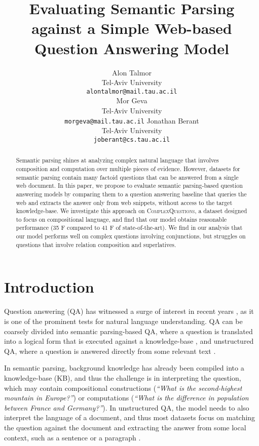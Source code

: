 \documentclass[11pt,a4paper]{article}
\title{Evaluating Semantic Parsing against a Simple Web-based Question Answering Model}
\author{Alon Talmor \\ Tel-Aviv University \\  {\small \tt alontalmor@mail.tau.ac.il} \\ 
         \And  Mor Geva \\ Tel-Aviv University \\  {\small \tt morgeva@mail.tau.ac.il} \And
         Jonathan Berant \\ Tel-Aviv University \\ {\small \tt joberant@cs.tau.ac.il}}
\date{}
\newcommand\nl[1]{{\it``#1''}}
\begin{document}
\maketitle

\begin{abstract}
Semantic parsing shines at analyzing complex natural language that involves composition and computation over multiple pieces of evidence. However, datasets for semantic parsing contain many factoid questions that can be answered from a single web document. 
In this paper, 
we propose to evaluate semantic parsing-based question answering models by comparing them to a  question answering baseline that queries the web and extracts the answer only from web snippets, without access to the target knowledge-base. We investigate 
this approach on \textsc{ComplexQuestions}, a dataset designed to focus on compositional language, and find that our model obtains reasonable performance (35 F compared to 41 F of state-of-the-art). We find in our analysis that our model performs well on complex questions involving conjunctions, but struggles on questions that involve relation composition and superlatives.
\end{abstract}

\section{Introduction}
Question answering (QA) has witnessed a surge of interest in recent years \cite{hill2015goldilocks,yang2015wikiqa,pasupat2015compositional,chen2016thorough,joshi2017triviaqa}, as it is one of the prominent tests for natural language understanding. QA can be coarsely divided into semantic parsing-based QA, where a question is translated into a logical form that is executed against a knowledge-base \cite{zelle96geoquery,zettlemoyer05ccg,liang11dcs,kwiatkowski2013scaling,reddy2014large,berant2015agenda}, and unstructured QA, where a question is answered directly from some relevant text \cite{voorhees2000building,hermann2015read,hewlett2016wikireading,kadlec2016text,seo2016bidaf}. 

In semantic parsing, background knowledge has already been compiled into a knowledge-base (KB), and thus the challenge is in interpreting the question, which may contain compositional constructions (\nl{What is the second-highest mountain in Europe?}) or computations (\nl{What is the difference in population between France and Germany?}). In unstructured QA, the model needs to  also interpret the language of a document, and thus most datasets focus on matching the question against the document and extracting the answer from some local context, such as a sentence or a paragraph \cite{onishi2016wdw,rajpurkar2016squad,yang2015wikiqa}.
\end{document}
